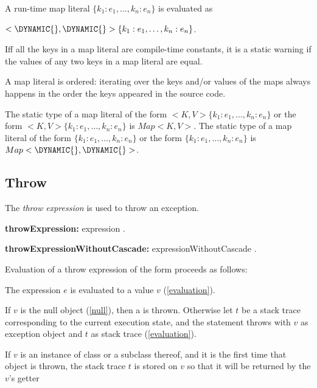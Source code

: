 \documentclass{article}
\begin{document}
\LMHash{}
A run-time map literal $\{k_1:e_1, \ldots, k_n :e_n\}$ is evaluated as

$<\DYNAMIC{}, \DYNAMIC{}>\{k_1:e_1, \ldots, k_n :e_n\}$.

\LMHash{}
If{}f all the keys in a map literal are compile-time constants, it is a static warning if the values of any two keys in a map literal are equal.

\LMHash{}
A map literal is ordered: iterating over the keys and/or values of the maps always happens in the
 order the keys appeared in the source code.


\LMHash{}
The static type of a map literal of the form \CONST{}$ <K, V>\{k_1:e_1, \ldots, k_n :e_n\}$ or the form $<K, V>\{k_1:e_1, \ldots, k_n :e_n\}$ is $Map<K, V>$.
The static type of a map literal of the form \CONST{}$\{k_1:e_1, \ldots, k_n :e_n\}$ or the form $\{k_1:e_1, \ldots, k_n :e_n\}$ is $Map<\DYNAMIC{}, \DYNAMIC{}>$.


\subsection{Throw}

\LMHash{}
The {\em throw expression} is used to throw an exception.

\begin{grammar}
{\bf throwExpression:}\THROW{} expression
  .

{\bf throwExpressionWithoutCascade:}\THROW{} expressionWithoutCascade
  .
\end{grammar}

\LMHash{}
Evaluation of a throw expression of the form  proceeds as follows:

\LMHash{}
The expression $e$ is evaluated to a value $v$ (\ref{evaluation}).


\LMHash{}
If $v$ is the null object (\ref{null}), then a  is thrown.
Otherwise let $t$ be a stack trace corresponding to the current execution state,
and the \THROW{} statement throws with $v$ as exception object
and $t$ as stack trace (\ref{evaluation}).

\LMHash{}
If $v$ is an instance of class  or a subclass thereof,
and it is the first time that  object is thrown,
the stack trace $t$ is stored on $v$ so that it will be returned
by the $v$'s  getter
\end{document}
